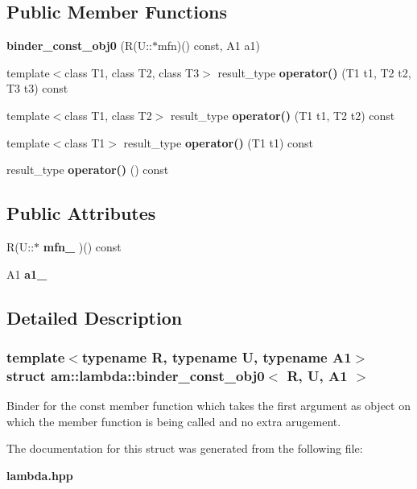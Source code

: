 \subsection*{Public Member Functions}
\begin{CompactItemize}
\item 
\textbf{binder\_\-const\_\-obj0} (R(U::$\ast$mfn)() const, A1 a1)\label{structam_1_1lambda_1_1binder__const__obj0_9b3f2e787da9f85bd99ff36e10cdbe10}

\item 
template$<$class T1, class T2, class T3$>$ result\_\-type \textbf{operator()} (T1 t1, T2 t2, T3 t3) const \label{structam_1_1lambda_1_1binder__const__obj0_a8658166542e56fa40645d7ae7ada3e0}

\item 
template$<$class T1, class T2$>$ result\_\-type \textbf{operator()} (T1 t1, T2 t2) const\label{structam_1_1lambda_1_1binder__const__obj0_47d6a0211959332726d12a7790921a3f}

\item 
template$<$class T1$>$ result\_\-type \textbf{operator()} (T1 t1) const \label{structam_1_1lambda_1_1binder__const__obj0_824a51c217745d5ce0ba139749025861}

\item 
result\_\-type \textbf{operator()} () const\label{structam_1_1lambda_1_1binder__const__obj0_cca85eae6079b261eec439d2911f59c3}

\end{CompactItemize}
\subsection*{Public Attributes}
\begin{CompactItemize}
\item 
R(U::$\ast$ \textbf{mfn\_\-} )() const\label{structam_1_1lambda_1_1binder__const__obj0_2fb09560f852e16a7d654ef63091aff0}

\item 
A1 \textbf{a1\_\-}\label{structam_1_1lambda_1_1binder__const__obj0_b46685b5ad8a378c0e8b125eff4122ad}

\end{CompactItemize}


\subsection{Detailed Description}
\subsubsection*{template$<$typename R, typename U, typename A1$>$ struct am::lambda::binder\_\-const\_\-obj0$<$ R, U, A1 $>$}

Binder for the const member function which takes the first argument as object on which the member function is being called and no extra arugement. 



The documentation for this struct was generated from the following file:\begin{CompactItemize}
\item 
{\bf lambda.hpp}\end{CompactItemize}
